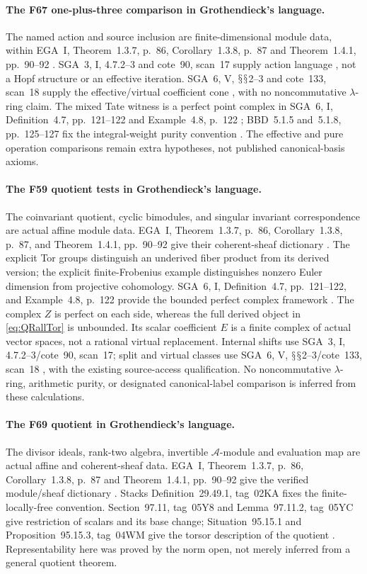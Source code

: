 \documentclass[11pt,a4paper]{article}
\renewcommand{\S}{\ensuremath{\mathsection}}
\newcommand{\fid}[1]{\textsf{#1}}\newcommand{\gate}[1]{\textsf{#1}}
\theoremstyle{named}\newtheorem{finding}{Finding}[section]
\theoremstyle{definition}\newtheorem{definition}[finding]{Definition}
\theoremstyle{remark}\newtheorem{remark}[finding]{Remark}
\begin{document}
\paragraph{The \fid{F67} one-plus-three comparison in Grothendieck's language.}
The named action and source inclusion are
finite-dimensional module data, within
EGA~I, Theorem~1.3.7, p.~86,
Corollary~1.3.8, p.~87 and
Theorem~1.4.1, pp.~90--92 \cite{EGA}.
SGA~3, I, 4.7.2--3 and cote~90, scan~17
supply action language \cite{SGA3,Archive},
not a Hopf structure or an effective iteration.
SGA~6, V, \S\S2--3 and cote~133, scan~18
supply the effective/virtual coefficient cone
\cite{SGA6,Archive}, with no noncommutative
\(\lambda\)-ring claim.
The mixed Tate witness is a perfect point
complex in SGA~6, I, Definition~4.7,
pp.~121--122 and Example~4.8, p.~122
\cite{SGA6}; BBD~5.1.5 and~5.1.8,
pp.~125--127 fix the integral-weight purity
convention \cite{BBD}.
The effective and pure operation comparisons
remain extra hypotheses, not published
canonical-basis axioms.

\paragraph{The F59 quotient tests in Grothendieck's language.}
The coinvariant quotient, cyclic bimodules, and
singular invariant correspondence are actual
affine module data. EGA~I, Theorem~1.3.7, p.~86,
Corollary~1.3.8, p.~87, and Theorem~1.4.1,
pp.~90--92 give their coherent-sheaf dictionary
\cite{EGA}. The explicit Tor groups distinguish
an underived fiber product from its derived
version; the explicit finite-Frobenius example
distinguishes nonzero Euler dimension from
projective cohomology.
SGA~6, I, Definition~4.7, pp.~121--122, and
Example~4.8, p.~122 provide the bounded perfect
complex framework \cite{SGA6}. The complex \(Z\)
is perfect on each side, whereas the full derived
object in \eqref{eq:QRallTor} is unbounded.
Its scalar coefficient \(E\) is a finite complex
of actual vector spaces, not a rational virtual
replacement. Internal shifts use SGA~3, I,
4.7.2--3/cote~90, scan~17; split and virtual
classes use SGA~6, V, \S\S2--3/cote~133, scan~18
\cite{SGA3,SGA6,Archive}, with the existing
source-access qualification.
No noncommutative \(\lambda\)-ring, arithmetic
purity, or designated canonical-label comparison
is inferred from these calculations.

\paragraph{The \fid{F69} quotient in Grothendieck's language.}
The divisor ideals, rank-two algebra, invertible
\(\mathcal A\)-module and evaluation map are actual
affine and coherent-sheaf data.
EGA~I, Theorem~1.3.7, p.~86, Corollary~1.3.8,
p.~87 and Theorem~1.4.1, pp.~90--92 give the
verified module/sheaf dictionary \cite{EGA}.
Stacks Definition~29.49.1, tag~02KA fixes
the finite-locally-free convention.
Section~97.11, tag~05Y8 and Lemma~97.11.2,
tag~05YC give restriction of scalars and its
base change; Situation~95.15.1 and
Proposition~95.15.3, tag~04WM give the torsor
description of the quotient
\cite{StacksVariableQuotients}.
Representability here was proved by the norm open,
not merely inferred from a general quotient theorem.
\end{document}
